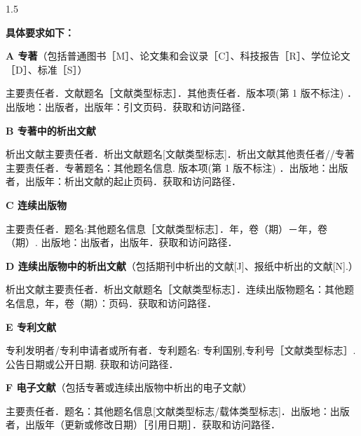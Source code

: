 \documentclass[UTF8, scheme=chinese, openany, oneside]{ctexbook}
\begin{document}
\begin{spacing}{1.5}

\vspace{0.3cm}
\noindent \textbf{具体要求如下：}

\vspace{0.3cm}
\noindent \textbf{A 专著}（包括普通图书［M］、论文集和会议录［C］、科技报告［R］、学位论文［D］、标准［S］）

\vspace{0.3cm}
\noindent 主要责任者．文献题名［文献类型标志］．其他责任者．{\color{magenta}版本项(第 1 版不标注)} ．出版地：出版者，出版年：引文页码．获取和访问路径．

\vspace{0.3cm}
\noindent \textbf{B 专著中的析出文献}

\vspace{0.3cm}
\noindent 析出文献主要责任者．析出文献题名[文献类型标志]．析出文献其他责任者//专著主要责任者．专著题名：其他题名信息. {\color{magenta}版本项(第 1 版不标注)} ．出版地：出版者，出版年：析出文献的起止页码．获取和访问路径．

\vspace{0.3cm}
\noindent \textbf{C 连续出版物}

\vspace{0.3cm}
\noindent 主要责任者．题名:其他题名信息［文献类型标志］．年，卷（期）－年，卷（期）. 出版地：出版者，出版年．获取和访问路径．

\vspace{0.3cm}
\noindent \textbf{D 连续出版物中的析出文献}（包括期刊中析出的文献[J]、报纸中析出的文献[N].）

\vspace{0.3cm}
\noindent 析出文献主要责任者．析出文献题名［文献类型标志］．连续出版物题名：其他题名信息，年，卷（期）：页码．获取和访问路径．

\vspace{0.3cm}
\noindent \textbf{E 专利文献}

\vspace{0.3cm}
\noindent 专利发明者/专利申请者或所有者．专利题名: 专利国别,专利号［文献类型标志］. 公告日期或公开日期. 获取和访问路径．

\vspace{0.3cm}
\noindent \textbf{F 电子文献}（包括专著或连续出版物中析出的电子文献）

\vspace{0.3cm}
\noindent 主要责任者．题名：其他题名信息[文献类型标志/载体类型标志]．出版地：出版者，出版年（更新或修改日期）［引用日期］．获取和访问路径．
\end{spacing}
\end{document}
